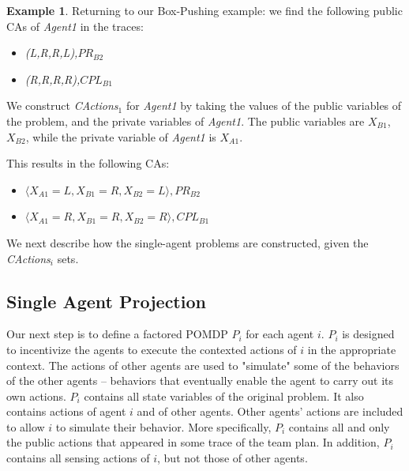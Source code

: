 \documentclass[letterpaper]{article} %
\theoremstyle{definition}
\newtheorem{example}{Example}
\newcommand{\ronen}[1]{\textbf{[\color{blue}RONEN:#1]}}
\newcommand{\cact}[1]{{\em CActions$_#1$}}
\begin{document}
\begin{example}
Returning to our Box-Pushing example: we find the following public CAs of \emph{Agent1} in the traces:
\begin{itemize}
    \item \emph{(L,R,R,L),$PR_{B2}$}
    \item \emph{(R,R,R,R),$CPL_{B1}$}
\end{itemize}


We construct \cact{1} for \emph{Agent1} by taking the values of the public variables of the problem, and the private variables of \emph{Agent1}. The public variables are $X_{B1}$, $X_{B2}$, while the private variable of \emph{Agent1} is $X_{A1}$. 

This results in the following CAs:
\begin{itemize}
    \item $\langle X_{A1}=L, X_{B1}=R, X_{B2}=L\rangle ,PR_{B2}$
    \item $\langle X_{A1}=R, X_{B1}=R, X_{B2}=R\rangle ,CPL_{B1}$
\end{itemize}
\end{example}

We next describe how the single-agent problems are constructed, given the \cact{i} sets.


\subsection{Single Agent Projection}


Our next step is to define a factored POMDP $P_i$ for each agent $i$. $P_i$ is designed to incentivize the agents to execute the contexted actions of $i$ in the appropriate context.
The actions of other agents are used to "simulate" some of the behaviors of the other agents -- behaviors that eventually enable the agent to carry out its own actions.
$P_i$ contains all state variables of the original problem. It also contains actions of agent $i$ and of other agents. Other agents' actions are included to allow $i$ to simulate their behavior. More specifically,
$P_i$ contains all and only 
the public actions that appeared in some trace of the team plan.
In addition, $P_i$ contains all sensing actions of $i$, but not those of
other agents. 
\end{document}
